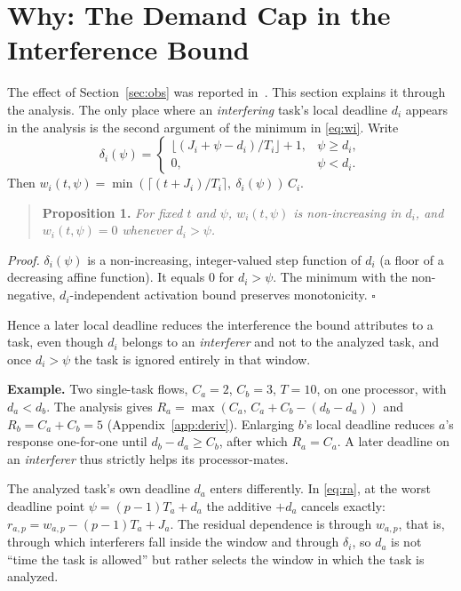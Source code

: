 \documentclass[conference]{IEEEtran}
\begin{document}
\section{Why: The Demand Cap in the Interference Bound}
\label{sec:why}

The effect of Section~\ref{sec:obs} was reported in~\cite{rivas15}. This section
explains it through the analysis. The only place where an \emph{interfering}
task's local deadline $d_i$ appears in the analysis is the second argument of the
minimum in \eqref{eq:wi}. Write
\begin{equation}
\delta_i(\psi) =
\begin{cases}
\big\lfloor (J_i + \psi - d_i)/T_i \big\rfloor + 1, & \psi \ge d_i,\\
0, & \psi < d_i.
\end{cases}
\label{eq:cap}
\end{equation}
Then $w_i(t,\psi)=\min(\lceil (t+J_i)/T_i\rceil,\ \delta_i(\psi))\,C_i$.

\begin{quote}
\textbf{Proposition 1.} \emph{For fixed $t$ and $\psi$, $w_i(t,\psi)$ is
non-increasing in $d_i$, and $w_i(t,\psi)=0$ whenever $d_i>\psi$.}
\end{quote}
\noindent\emph{Proof.} $\delta_i(\psi)$ is a non-increasing, integer-valued step
function of $d_i$ (a floor of a decreasing affine function). It equals $0$ for
$d_i>\psi$. The minimum with the non-negative, $d_i$-independent activation bound
preserves monotonicity. $\square$

Hence a later local deadline reduces the interference the bound attributes to a
task, even though $d_i$ belongs to an \emph{interferer} and not to the analyzed
task, and once $d_i>\psi$ the task is ignored entirely in that window.

\smallskip\noindent\textbf{Example.} Two single-task flows, $C_a=2$, $C_b=3$,
$T=10$, on one processor, with $d_a<d_b$. The analysis gives
$R_a=\max(C_a,\,C_a+C_b-(d_b-d_a))$ and $R_b=C_a+C_b=5$
(Appendix~\ref{app:deriv}). Enlarging $b$'s local deadline reduces $a$'s
response one-for-one until $d_b-d_a\ge C_b$, after which $R_a=C_a$. A later
deadline on an \emph{interferer} thus strictly helps its processor-mates.

The analyzed task's own deadline $d_a$ enters differently. In \eqref{eq:ra}, at
the worst deadline point $\psi=(p{-}1)T_a+d_a$ the additive $+d_a$ cancels
exactly: $r_{a,p}=w_{a,p}-(p{-}1)T_a+J_a$. The residual dependence is through
$w_{a,p}$, that is, through which interferers fall inside the window and through
$\delta_i$, so $d_a$ is not ``time the task is allowed'' but rather selects the
window in which the task is analyzed.
\end{document}
